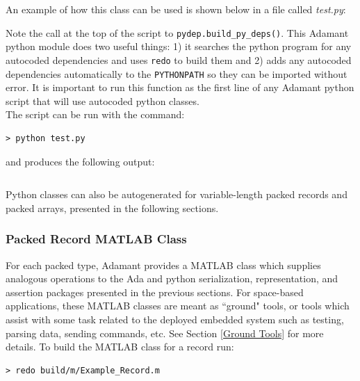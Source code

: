 An example of how this class can be used is shown below in a file called \textit{test.py}:


Note the call at the top of the script to \texttt{pydep.build\_py\_deps()}. This Adamant python module does two useful things: 1) it searches the python program for any autocoded dependencies and uses \texttt{redo} to build them and 2) adds any autocoded dependencies automatically to the \texttt{PYTHONPATH} so they can be imported without error. It is important to run this function as the first line of any Adamant python script that will use autocoded python classes. \\

The script can be run with the command:

\vspace{5mm} %
\begin{verbatim}
> python test.py
\end{verbatim}
\vspace{5mm} %

and produces the following output:

\vspace{5mm} %
\inputminted{text}{../example_architecture/record_py/output.txt}
\vspace{5mm} %

Python classes can also be autogenerated for variable-length packed records and packed arrays, presented in the following sections.

\subsubsection{Packed Record MATLAB Class} \label{Packed Record MATLAB Class}

For each packed type, Adamant provides a MATLAB class which supplies analogous operations to the Ada and python serialization, representation, and assertion packages presented in the previous sections. For space-based applications, these MATLAB classes are meant as ``ground" tools, or tools which assist with some task related to the deployed embedded system such as testing, parsing data, sending commands, etc. See Section \ref{Ground Tools} for more details. To build the MATLAB class for a record run:

\vspace{5mm} %
\begin{verbatim}
> redo build/m/Example_Record.m
\end{verbatim}
\vspace{5mm} %

